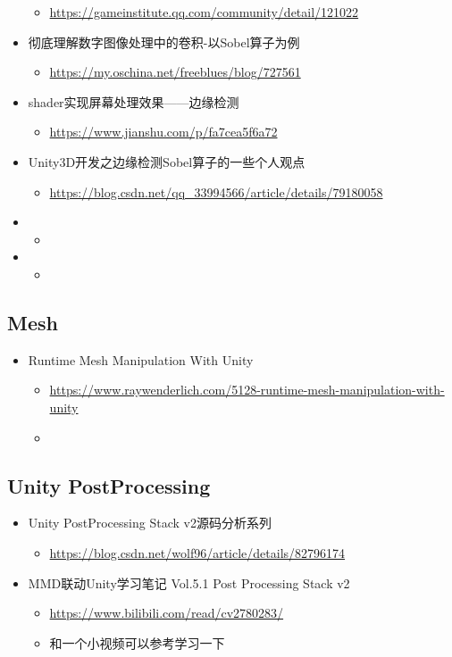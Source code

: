 \documentclass[9pt, b5paper]{article}
\begin{document}
\begin{itemize}
\begin{itemize}
\item \url{https://gameinstitute.qq.com/community/detail/121022}
\end{itemize}
\item 彻底理解数字图像处理中的卷积-以Sobel算子为例
\begin{itemize}
\item \url{https://my.oschina.net/freeblues/blog/727561}
\end{itemize}
\item shader实现屏幕处理效果——边缘检测
\begin{itemize}
\item \url{https://www.jianshu.com/p/fa7cea5f6a72}
\end{itemize}
\item Unity3D开发之边缘检测Sobel算子的一些个人观点
\begin{itemize}
\item \url{https://blog.csdn.net/qq_33994566/article/details/79180058}
\end{itemize}
\item \begin{itemize}
\item 
\end{itemize}
\item \begin{itemize}
\item 
\end{itemize}
\end{itemize}
\subsection{Mesh}
\label{sec-2-7}
\begin{itemize}
\item Runtime Mesh Manipulation With Unity
\begin{itemize}
\item \url{https://www.raywenderlich.com/5128-runtime-mesh-manipulation-with-unity}
\item 
\end{itemize}
\end{itemize}
\subsection{Unity PostProcessing}
\label{sec-2-8}
\begin{itemize}
\item Unity PostProcessing Stack v2源码分析系列
\begin{itemize}
\item \url{https://blog.csdn.net/wolf96/article/details/82796174}
\end{itemize}
\item MMD联动Unity学习笔记 Vol.5.1 Post Processing Stack v2
\begin{itemize}
\item \url{https://www.bilibili.com/read/cv2780283/}
\item 和一个小视频可以参考学习一下
\end{itemize}
\end{itemize}
\end{document}
